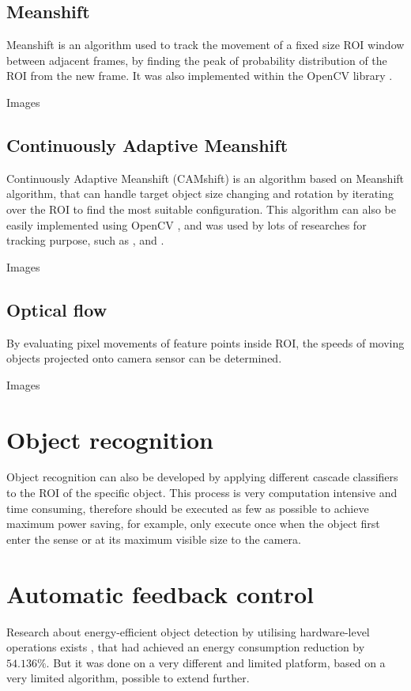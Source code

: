 \subsection{Meanshift}

Meanshift \cite{fukunaga2013introduction} is an algorithm used to track the movement of a fixed size ROI window between adjacent frames, by finding the peak of probability distribution of the ROI from the new frame. It was also implemented within the OpenCV library \cite{opencv:camshift}.

{\color{red}Images}

\subsection{Continuously Adaptive Meanshift}

Continuously Adaptive Meanshift (CAMshift) \cite{bradski1998computer} is an algorithm based on Meanshift algorithm, that can handle target object size changing and rotation by iterating over the ROI to find the most suitable configuration. This algorithm can also be easily implemented using OpenCV \cite{opencv:camshift}, and was used by lots of researches for tracking purpose, such as \cite{chu2007object}, \cite{xu2012moving} and \cite{nouar2006improved}.

{\color{red}Images}

\subsection {Optical flow}

By evaluating pixel movements of feature points inside ROI, the speeds of moving objects projected onto camera sensor can be determined.

{\color{red}Images}

\section{Object recognition}

Object recognition can also be developed by applying different cascade classifiers to the ROI of the specific object. This process is very computation intensive and time consuming, therefore should be executed as few as possible to achieve maximum power saving, for example, only execute once when the object first enter the sense or at its maximum visible size to the camera.

\section{Automatic feedback control}

Research about energy-efficient object detection by utilising hardware-level operations exists \cite{casares2011energy}, that had achieved an energy consumption reduction by $54.136\%$. But it was done on a very different and limited platform, based on a very limited algorithm, possible to extend further.

